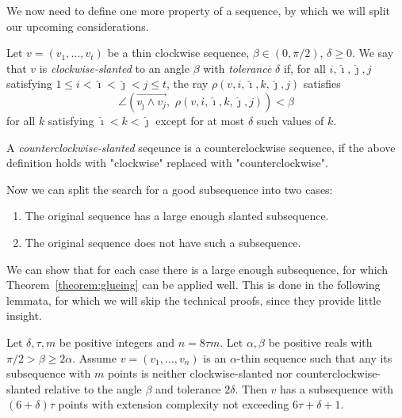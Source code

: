 We now need to define one more property of a sequence, by which we will split our upcoming considerations.

\begin{definition}
  Let $v=(v_1,\ldots,v_t)$ be a thin clockwise sequence, ${\beta\in(0,\pi/2)}$, $\delta\geqslant 0$. We say that $v$ is \textit{clockwise-slanted} to an angle $\beta$ with \textit{tolerance} $\delta$ if, for all $i,\hat{\imath},\hat{\jmath}, j$ satisfying $1\leqslant i<\hat{\imath}<\hat{\jmath}<j\leqslant t$, the ray ${\rho}(v,i,\hat{\imath},k,\hat{\jmath}, j)$ satisfies $$\angle\left(\overrightarrow{v_{\hat{\jmath}}\wedge v_j},\,\,\rho(v,i,\hat{\imath},k,\hat{\jmath}, j)\right)<\beta$$ for all $k$ satisfying $\hat{\imath}<k<\hat{\jmath}$ except for at most $\delta$ such values of $k$. 

  A \textit{counterclockwise-slanted} seqeunce is a counterclockwise sequence, if the above definition holds with "clockwise" replaced with "counterclockwise".
\end{definition}

Now we can split the search for a good subsequence into two cases:
\begin{enumerate}
  \item The original sequence has a large enough slanted subsequence.
  \item The original sequence does not have such a subsequence.
\end{enumerate}

We can show that for each case there is a large enough subsequence, for which Theorem~\ref{theorem:glueing} can be applied well. This is done in the following lemmata, for which we will skip the technical proofs, since they provide little insight.


\begin{lemma}\label{lemma:unslanted-subseqence}
  Let $\delta, \tau, m$ be positive integers and $n=8\tau m$. Let $\alpha,\beta$ be positive reals with $\pi/2>\beta\geqslant 2\alpha$. Assume $v=(v_1,\ldots,v_n)$ is an $\alpha$-thin sequence such that any its subsequence with $m$ points is neither clockwise-slanted nor counterclockwise-slanted relative to the angle $\beta$ and tolerance $2\delta$. Then $v$ has a subsequence with $(6+\delta)\tau$ points with extension complexity not exceeding $6\tau+\delta+1$.
\end{lemma}

